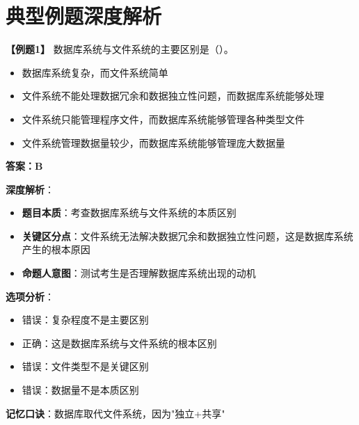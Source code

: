 \documentclass[12pt, a4paper]{article}
\newenvironment{bluebox}[1]{%
  \begin{trivlist}
  \item[\hskip\labelsep \textbf{#1}]
  \setlength{\parskip}{0.5ex}
  \setlength{\itemsep}{0.5ex}
}{%
  \end{trivlist}
}
\begin{document}
\section{典型例题深度解析}

\begin{bluebox}{例题1}
	\textbf{【例题1】} 数据库系统与文件系统的主要区别是（\quad）。

	\begin{itemize}
		\item[A)] 数据库系统复杂，而文件系统简单
		\item[B)] 文件系统不能处理数据冗余和数据独立性问题，而数据库系统能够处理
		\item[C)] 文件系统只能管理程序文件，而数据库系统能够管理各种类型文件
		\item[D)] 文件系统管理数据量较少，而数据库系统能够管理庞大数据量
	\end{itemize}

	\textbf{答案：B}

	\textbf{深度解析}：

	\begin{itemize}
		\item \textbf{题目本质}：考查数据库系统与文件系统的本质区别
		\item \textbf{关键区分点}：文件系统无法解决数据冗余和数据独立性问题，这是数据库系统产生的根本原因
		\item \textbf{命题人意图}：测试考生是否理解数据库系统出现的动机
	\end{itemize}

	\textbf{选项分析}：

	\begin{itemize}
		\item[A] 错误：复杂程度不是主要区别
		\item[B] 正确：这是数据库系统与文件系统的根本区别
		\item[C] 错误：文件类型不是关键区别
		\item[D] 错误：数据量不是本质区别
	\end{itemize}

	\textbf{记忆口诀}：数据库取代文件系统，因为"独立+共享"
\end{bluebox}
\end{document}
